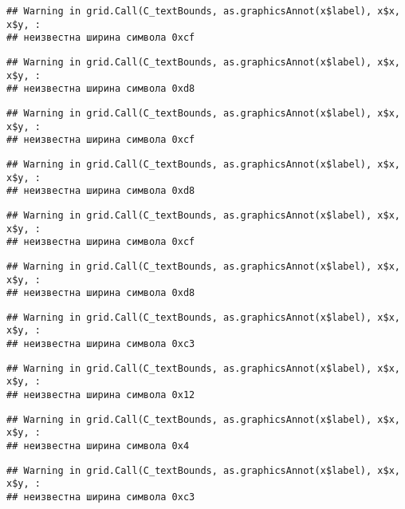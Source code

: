 \documentclass[
]{article}
\begin{document}
\begin{verbatim}
## Warning in grid.Call(C_textBounds, as.graphicsAnnot(x$label), x$x, x$y, :
## неизвестна ширина символа 0xcf
\end{verbatim}

\begin{verbatim}
## Warning in grid.Call(C_textBounds, as.graphicsAnnot(x$label), x$x, x$y, :
## неизвестна ширина символа 0xd8
\end{verbatim}

\begin{verbatim}
## Warning in grid.Call(C_textBounds, as.graphicsAnnot(x$label), x$x, x$y, :
## неизвестна ширина символа 0xcf
\end{verbatim}

\begin{verbatim}
## Warning in grid.Call(C_textBounds, as.graphicsAnnot(x$label), x$x, x$y, :
## неизвестна ширина символа 0xd8
\end{verbatim}

\begin{verbatim}
## Warning in grid.Call(C_textBounds, as.graphicsAnnot(x$label), x$x, x$y, :
## неизвестна ширина символа 0xcf
\end{verbatim}

\begin{verbatim}
## Warning in grid.Call(C_textBounds, as.graphicsAnnot(x$label), x$x, x$y, :
## неизвестна ширина символа 0xd8
\end{verbatim}

\begin{verbatim}
## Warning in grid.Call(C_textBounds, as.graphicsAnnot(x$label), x$x, x$y, :
## неизвестна ширина символа 0xc3
\end{verbatim}

\begin{verbatim}
## Warning in grid.Call(C_textBounds, as.graphicsAnnot(x$label), x$x, x$y, :
## неизвестна ширина символа 0x12
\end{verbatim}

\begin{verbatim}
## Warning in grid.Call(C_textBounds, as.graphicsAnnot(x$label), x$x, x$y, :
## неизвестна ширина символа 0x4
\end{verbatim}

\begin{verbatim}
## Warning in grid.Call(C_textBounds, as.graphicsAnnot(x$label), x$x, x$y, :
## неизвестна ширина символа 0xc3
\end{verbatim}
\end{document}
